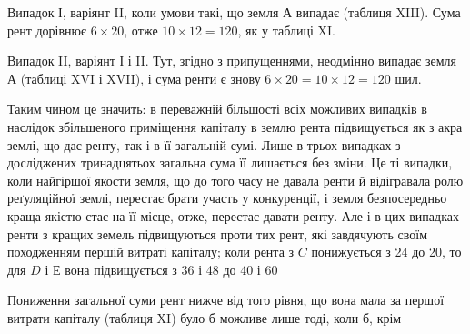 Випадок І, варіянт II, коли умови такі, що земля $А$ випадає (таблиця XIII).
Сума рент дорівнює $6 × 20$, отже $10 × 12 = 120$, як у таблиці XI.

Випадок II, варіянт І і II. Тут, згідно з припущеннями, неодмінно випадає
земля $А$ (таблиці XVI і XVII), і сума ренти є знову $6 × 20 = 10 × 12 =
120$ шил.

Таким чином це значить: в переважній більшості всіх можливих випадків
в наслідок збільшеного приміщення капіталу в землю рента підвищується як
з акра землі, що дає ренту, так і в її загальній сумі. Лише в трьох випадках
з досліджених тринадцятьох загальна сума її лишається без зміни. Це ті випадки,
коли найгіршої якости земля, що до того часу не давала ренти й відігравала
ролю реґуляційної землі, перестає брати участь у конкуренції, і земля безпосередньо
краща якістю стає на її місце, отже, перестає давати ренту. Але і в
цих випадках ренти з кращих земель підвищуються проти тих рент, які завдячують
своїм походженням першій витраті капіталу; коли рента з $C$ понижується
з 24 до 20, то для $D$ і $Е$ вона підвищується з 36 і 48 до 40 і 60

Пониження загальної суми рент нижче від того рівня, що вона мала за
першої витрати капіталу (таблиця XI) було б можливе лише тоді, коли б, крім
\parbreak{}  %
